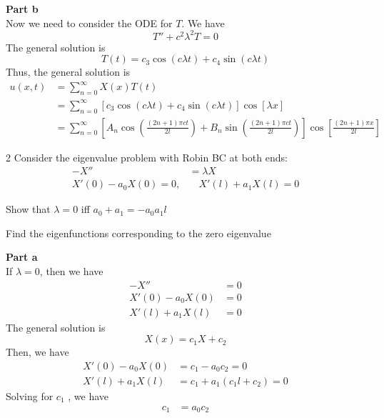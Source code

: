 \documentclass[answers,12pt,addpoints]{exam}
\begin{document}
\begin{questions}
\begin{solution}
        \textbf{Part b} \\
        Now we need to consider the ODE for \( T \). We have
        \[ T'' + c^2\lambda^2T = 0 \]
        The general solution is
        \[ T(t) = c_3\cos(c\lambda t) + c_4\sin(c\lambda t) \]
        Thus, the general solution is
        \begin{align*}
            u(x,t) &= \sum_{n=0}^{\infty}X(x)T(t)\\
            &= \sum_{n=0}^{\infty} \left[ c_3\cos(c\lambda t) + c_4\sin(c\lambda t) \right] \cos\left[ \lambda x \right]\\
            &= \sum_{n=0}^{\infty} \left[ A_n \cos\left( \frac{(2n+1)\pi c t}{2l} \right) + B_n \sin\left( \frac{(2n+1)\pi c t}{2l} \right) \right] \cos\left[ \frac{(2n+1)\pi x}{2l} \right]
        \end{align*}
    \end{solution}
     2
    Consider the eigenvalue problem with Robin BC at both ends:
    \begin{align*}
        -X'' &= \lambda X \\
        X'(0) - a_0X(0) = 0, &\quad X'(l) + a_1X(l) = 0
    \end{align*}
    \begin{parts}
        \item Show that $\lambda = 0$ iff $a_0 + a_1 = -a_0a_1l$
        \item Find the eigenfunctions corresponding to the zero eigenvalue
    \end{parts}
    \begin{solution}
        \textbf{Part a} \\
        If $\lambda = 0$, then we have
        \begin{align*}
            -X'' &= 0 \\
            X'(0) - a_0X(0) &= 0 \\
            X'(l) + a_1X(l) &= 0
        \end{align*}
        The general solution is
        \[ X(x) = c_1X + c_2 \]
        Then, we have
        \begin{align*}
            X'(0) - a_0X(0) &= c_1 - a_0c_2 = 0 \\
            X'(l) + a_1X(l) &= c_1 + a_1(c_1 l + c_2) = 0
        \end{align*}
        Solving for $c_1$ , we have
        \begin{align*}
            c_1 &= a_0c_2 \\
        \end{align*}

\end{solution}
\end{questions}
\end{document}
